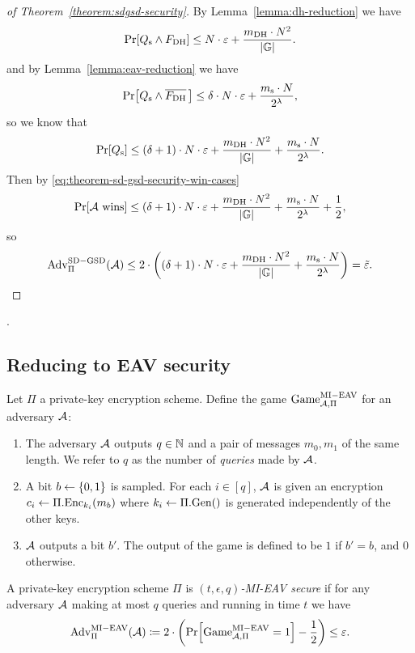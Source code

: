 \begin{proof}[of Theorem~\ref{theorem:sdgsd-security}]
	By Lemma~\vref{lemma:dh-reduction} we have
	\[
		\pr{\qs \land \fdh} \le N \cdot \epsilon + \frac{\mdh \cdot N^2}{\abs{\mathbb{G}}}.
	\]
	and by Lemma~\vref{lemma:eav-reduction} we have
	\[
		\pr{\qs \land \overline{\fdh}\,} \le \delta \cdot N \cdot \epsilon + \frac{\ms \cdot N}{2^\lambda},
	\]
	so we know that
	\[
		\pr{\qs} \le (\delta + 1) \cdot N \cdot \epsilon + \frac{\mdh \cdot N^2}{\abs{\mathbb{G}}} + \frac{\ms \cdot N}{2^\lambda}.
	\]
	Then by \eqref{eq:theorem-sd-gsd-security-win-cases}
	\[
		\pr{\wins} \le (\delta + 1) \cdot N \cdot \epsilon + \frac{\mdh \cdot N^2}{\abs{\mathbb{G}}} + \frac{\ms \cdot N}{2^\lambda} + \frac{1}{2},
	\] so
	\[
		\mathrm{Adv}_{\Pi}^{\mathrm{SD-GSD}}(\mathcal{A}) \le 2 \cdot \left((\delta + 1) \cdot N \cdot \varepsilon + \frac{m_\mathrm{DH} \cdot N^2}{\lvert\mathbb{G}\rvert} + \frac{m_\mathrm{s} \cdot N}{2^\lambda}\right) = \tilde{\varepsilon}.
	\]
\end{proof}

.

\subsection{Reducing to EAV security}


\begin{definition}
	Let $\Pi$ a private-key encryption scheme. Define the game $\mathrm{Game}_{\mathcal{A}, \Pi}^{\mathrm{MI-EAV}}$ for an adversary $\mathcal{A}$:
	\begin{enumerate}[1.]
		\item The adversary $\mathcal{A}$ outputs $q \in \mathbb{N}$ and a pair of messages $m_0, m_1$ of the same length. We refer to $q$ as the number of \emph{queries} made by $\mathcal{A}$.
		\item A bit $b \leftarrow \{0, 1\}$ is sampled. For each $i \in [q]$, $\mathcal{A}$ is given an encryption $c_i \leftarrow \Pi.\mathrm{Enc}_{k_i}(m_b)$ where $k_i \leftarrow \Pi.\mathrm{Gen}()$ is generated independently of the other keys.
		\item $\mathcal{A}$ outputs a bit $b'$. The output of the game is defined to be $1$ if $b' = b$, and $0$ otherwise.
	\end{enumerate}
\end{definition}

\begin{definition}
	A private-key encryption scheme $\Pi$ is \emph{$(t, \epsilon, q)$-MI-EAV secure} if for any adversary $\mathcal{A}$ making at most $q$ queries and running in time $t$ we have
	\begin{align*}
		\mathrm{Adv}_{\Pi}^{\mathrm{MI-EAV}}(\adv) \coloneqq 2 \cdot \left(\pr{\mathrm{Game}_{\adv, \Pi}^{\mathrm{MI-EAV}} = 1} - \frac{1}{2}\right) \le \epsilon.
	\end{align*}
\end{definition}

